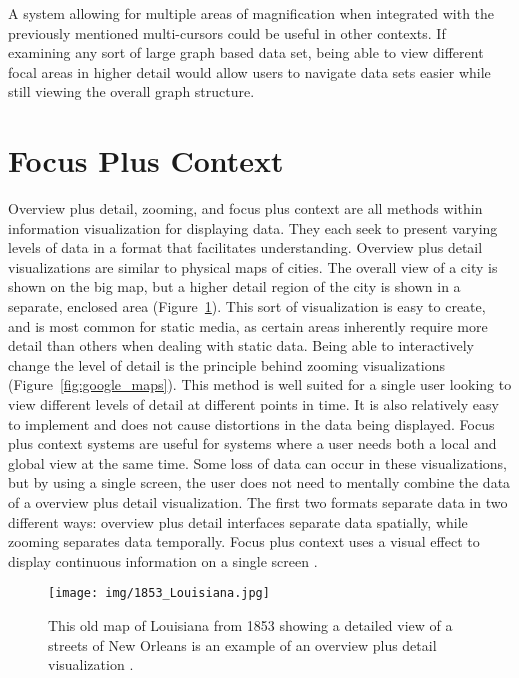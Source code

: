 A system allowing for multiple areas of magnification when integrated with the previously mentioned multi-cursors could be useful in other contexts. If examining any sort of large graph based data set, being able to view different focal areas in higher detail would allow users to navigate data sets easier while still viewing the overall graph structure.

\section{Focus Plus Context}
\label{section:intro_fac}
Overview plus detail, zooming, and focus plus context are all methods within information visualization for displaying data. They each seek to present varying levels of data in a format that facilitates understanding. Overview plus detail visualizations are similar to physical maps of cities. The overall view of a city is shown on the big map, but a higher detail region of the city is shown in a separate, enclosed area (Figure~\ref{fig:louisiana}). This sort of visualization is easy to create, and is most
common for static media, as certain areas inherently require more detail than others when dealing with static data. Being able to interactively change the level of detail is the principle behind zooming visualizations (Figure~\ref{fig:google_maps}). This method is well suited for a single user looking to view different levels of detail at different points in time. It is also relatively easy to implement and does not cause distortions in the data being displayed. Focus plus context systems are useful for systems
where a user needs both a local and global view at the same time. Some loss of data can occur in these visualizations, but by using a single screen, the user does not need to mentally combine the data of a overview plus detail visualization. The first two formats separate data in two
different ways: overview plus detail interfaces separate data spatially, while zooming separates data temporally. Focus plus context uses a visual effect to display continuous information on a single screen \cite{Cockburn2008}. 

\begin{figure}[htp] \centering
    \texttt{[image: img/1853\_Louisiana.jpg]}
    \caption[Overview Plus Detail]{This old map of Louisiana from 1853 showing a detailed view of a streets of New Orleans is an example of an overview plus detail visualization \cite{Mitchell1853}.}
    \label{fig:louisiana}
\end{figure}

